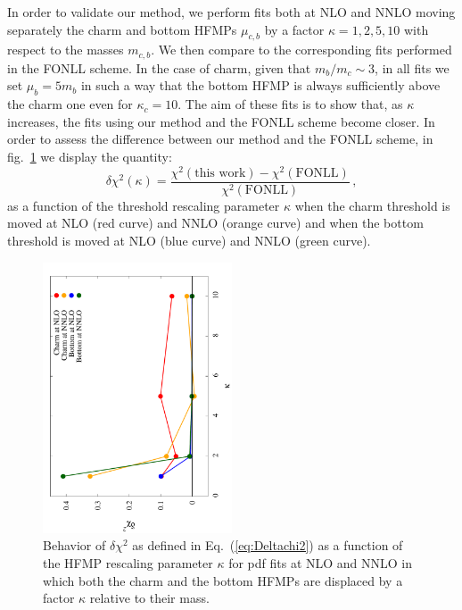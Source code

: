 \documentclass[letter,11pt]{article}
\begin{document}
In order to validate our method, we perform fits both at NLO and NNLO moving separately the charm and bottom HFMPs $\mu_{c,b}$ by a factor $\kappa=1,2,5,10$ with respect to the masses $m_{c,b}$. We then compare to the corresponding fits performed in the FONLL scheme. In the case of charm, given that $m_b/m_c\sim 3$, in all fits we set $\mu_b=5m_b$ in such a way that the bottom HFMP is always sufficiently above the charm one even for $\kappa_c = 10$. The aim of these fits is to show that, as $\kappa$ increases, the fits using our method and the FONLL scheme become closer. In order to assess the difference between our method and the FONLL scheme, in fig.~\ref{fig:chi2} we display the quantity:
%
\begin{equation}
\label{eq:Deltachi2}
\delta\chi^2(\kappa) = \frac{\chi^2(\mbox{this work}) - \chi^2(\mbox{FONLL})}{\chi^2(\mbox{FONLL})}\,,
\end{equation}
%
as a function of the threshold rescaling parameter $\kappa$ when the charm threshold is moved at NLO (red curve) and NNLO (orange curve) and when the bottom threshold is moved at NLO (blue curve) and NNLO (green curve). 
%
\begin{figure}[t]
\centering
\includegraphics[width=0.5\textwidth,angle=-90]{./chi2.pdf}
\caption{Behavior of $\delta\chi^2$ as defined in
  Eq.~(\ref{eq:Deltachi2}) as a function of the HFMP rescaling
  parameter $\kappa$ for pdf fits at NLO and NNLO in which both
  the charm and the bottom HFMPs are displaced by a factor $\kappa$ relative to
  their mass.}
\label{fig:chi2}
\end{figure}
%
%
\end{document}
